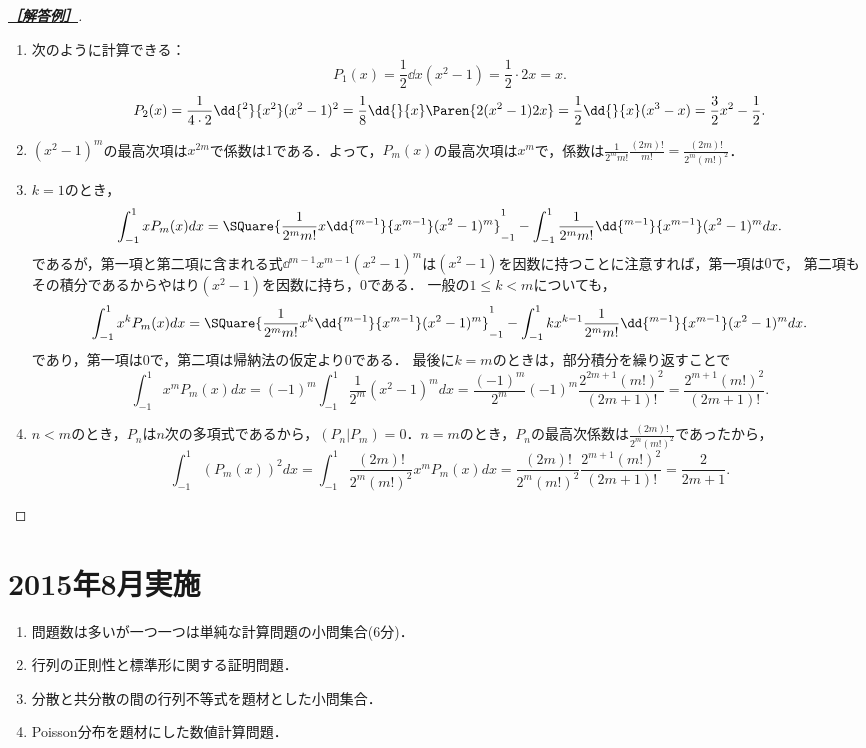 \documentclass[uplatex,dvipdfmx]{jsarticle}
\begin{document}
\begin{proof}[\textbf{\underline{［解答例］}}]\mbox{}
    \begin{enumerate}
        \item 次のように計算できる：
        \[P_1(x)=\frac{1}{2}\dd{}{x}(x^2-1)=\frac{1}{2}\cdot 2x=x.\]
        \[P_2(x)=\frac{1}{4\cdot 2}\dd{^2}{x^2}(x^2-1)^2=\frac{1}{8}\dd{}{x}\Paren{2(x^2-1)2x}=\frac{1}{2}\dd{}{x}(x^3-x)=\frac{3}{2}x^2-\frac{1}{2}.\]
        \item $(x^2-1)^m$の最高次項は$x^{2m}$で係数は$1$である．よって，$P_m(x)$の最高次項は$x^m$で，係数は$\frac{1}{2^mm!}\frac{(2m)!}{m!}=\frac{(2m)!}{2^m(m!)^2}$．
        \item $k=1$のとき，
        \[\int^1_{-1}xP_m(x)dx=\SQuare{\frac{1}{2^mm!}x\dd{^{m-1}}{x^{m-1}}(x^2-1)^m}^1_{-1}-\int^1_{-1}\frac{1}{2^mm!}\dd{^{m-1}}{x^{m-1}}(x^2-1)^mdx.\]
        であるが，第一項と第二項に含まれる式$\dd{^{m-1}}{x^{m-1}}(x^2-1)^m$は$(x^2-1)$を因数に持つことに注意すれば，第一項は$0$で，
        第二項もその積分であるからやはり$(x^2-1)$を因数に持ち，$0$である．
        一般の$1\le k<m$についても，
        \[\int^1_{-1}x^kP_m(x)dx=\SQuare{\frac{1}{2^mm!}x^k\dd{^{m-1}}{x^{m-1}}(x^2-1)^m}^1_{-1}-\int^1_{-1}kx^{k-1}\frac{1}{2^mm!}\dd{^{m-1}}{x^{m-1}}(x^2-1)^mdx.\]
        であり，第一項は$0$で，第二項は帰納法の仮定より$0$である．
        最後に$k=m$のときは，部分積分を繰り返すことで
        \[\int^1_{-1}x^mP_m(x)dx=(-1)^m\int^1_{-1}\frac{1}{2^m}(x^2-1)^mdx=\frac{(-1)^m}{2^m}(-1)^m\frac{2^{2m+1}(m!)^2}{(2m+1)!}=\frac{2^{m+1}(m!)^2}{(2m+1)!}.\]
        \item $n<m$のとき，$P_n$は$n$次の多項式であるから，$(P_n|P_m)=0$．$n=m$のとき，$P_n$の最高次係数は$\frac{(2m)!}{2^m(m!)^2}$であったから，
        \[\int^1_{-1}(P_m(x))^2dx=\int^1_{-1}\frac{(2m)!}{2^m(m!)^2}x^mP_m(x)dx=\frac{(2m)!}{2^m(m!)^2}\frac{2^{m+1}(m!)^2}{(2m+1)!}=\frac{2}{2m+1}.\]

    \end{enumerate}
\end{proof}

\section{2015年8月実施}

\begin{tcolorbox}[colframe=ForestGreen, colback=ForestGreen!10!white,breakable,colbacktitle=ForestGreen!40!white,coltitle=black,fonttitle=\bfseries\sffamily,
    title=概観]
    \begin{enumerate}[{第}1{問}]
        \item 問題数は多いが一つ一つは単純な計算問題の小問集合(6分)．
        \item 行列の正則性と標準形に関する証明問題．
        \item 分散と共分散の間の行列不等式を題材とした小問集合．
        \item Poisson分布を題材にした数値計算問題．
    \end{enumerate}
\end{tcolorbox}
\end{document}
